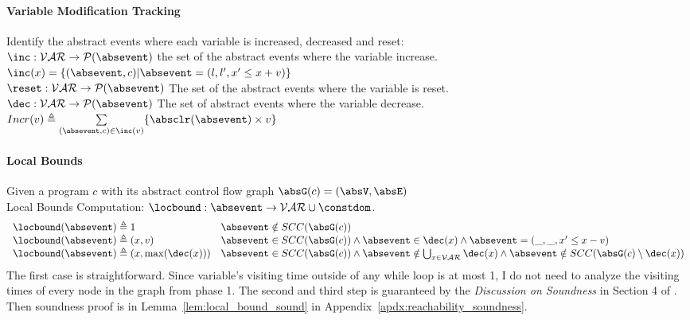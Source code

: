 \paragraph*{Variable Modification Tracking}
Identify the abstract events where each variable is increased, decreased and reset:
\\
$\inc: \mathcal{VAR} \to \mathcal{P}(\absevent) $
the set of the abstract events where the variable increase.
\\
$\inc(x) = \{(\absevent, c) | \absevent = (l, l', x' \leq x + v)\}$
\\
$\reset: \mathcal{VAR} \to \mathcal{P}(\absevent) $
The set of the abstract events where the variable is reset.
\\
$\dec: \mathcal{VAR} \to \mathcal{P}(\absevent) $
The set of abstract events where the variable decrease.
\\
$Incr(v) \triangleq \sum\limits_{(\absevent, c) \in \inc(v)}\{\absclr(\absevent) \times v\}$
%
\paragraph*{Local Bounds}
Given a program $c$ with its abstract control flow graph 
$\absG(c) = (\absV, \absE)$
\\
Local Bounds Computation:
$\locbound: \absevent \to \mathcal{VAR} \cup \constdom$.
%
\[ 
\begin{array}{ll}
  \locbound(\absevent) \triangleq 1 
  & \absevent \notin SCC(\absG(c))
  \\
  \locbound(\absevent) \triangleq (x, v) 
  & \absevent \in SCC(\absG(c)) \land \absevent \in \dec(x) \land  \absevent = (\_, \_ , x' \leq x - v) \\
  \locbound(\absevent) \triangleq (x, \max(\dec(x))) 
  & \absevent \in SCC(\absG(c)) \land 
  \absevent  \notin \bigcup_{x \in \mathcal{VAR}} \dec(x)
  \land \absevent \notin SCC(\absG(c) \setminus \dec(x)) 
\end{array}
  \]
  The first case is straightforward. Since variable's visiting time outside of any while loop is at most 1, I do not need to analyze the visiting times of every node in the graph from phase 1.
  The second and third step is guaranteed by the \emph{Discussion on Soundness} in Section 4 of \cite{SinnZV17}.
  Then soundness proof is in Lemma~\ref{lem:local_bound_sound} in Appendix~\ref{apdx:reachability_soundness}.
%
